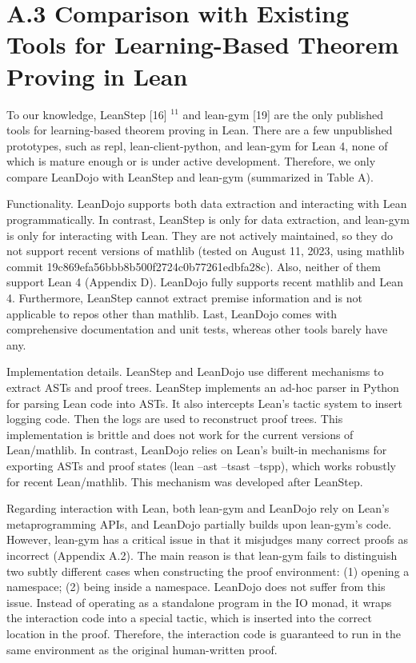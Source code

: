 \documentclass[
]{article}
\begin{document}
\section{A.3 Comparison with Existing Tools for Learning-Based Theorem
Proving in
Lean}\label{a.3-comparison-with-existing-tools-for-learning-based-theorem-proving-in-lean}

To our knowledge, LeanStep {[}16{]} \(^{11}\) and lean-gym {[}19{]} are
the only published tools for learning-based theorem proving in Lean.
There are a few unpublished prototypes, such as repl,
lean-client-python, and lean-gym for Lean 4, none of which is mature
enough or is under active development. Therefore, we only compare
LeanDojo with LeanStep and lean-gym (summarized in Table A).

Functionality. LeanDojo supports both data extraction and interacting
with Lean programmatically. In contrast, LeanStep is only for data
extraction, and lean-gym is only for interacting with Lean. They are not
actively maintained, so they do not support recent versions of mathlib
(tested on August 11, 2023, using mathlib commit
19c869efa56bbb8b500f2724c0b77261edbfa28c). Also, neither of them support
Lean 4 (Appendix D). LeanDojo fully supports recent mathlib and Lean 4.
Furthermore, LeanStep cannot extract premise information and is not
applicable to repos other than mathlib. Last, LeanDojo comes with
comprehensive documentation and unit tests, whereas other tools barely
have any.

Implementation details. LeanStep and LeanDojo use different mechanisms
to extract ASTs and proof trees. LeanStep implements an ad-hoc parser in
Python for parsing Lean code into ASTs. It also intercepts Lean's tactic
system to insert logging code. Then the logs are used to reconstruct
proof trees. This implementation is brittle and does not work for the
current versions of Lean/mathlib. In contrast, LeanDojo relies on Lean's
built-in mechanisms for exporting ASTs and proof states (lean --ast
--tsast --tspp), which works robustly for recent Lean/mathlib. This
mechanism was developed after LeanStep.

Regarding interaction with Lean, both lean-gym and LeanDojo rely on
Lean's metaprogramming APIs, and LeanDojo partially builds upon
lean-gym's code. However, lean-gym has a critical issue in that it
misjudges many correct proofs as incorrect (Appendix A.2). The main
reason is that lean-gym fails to distinguish two subtly different cases
when constructing the proof environment: (1) opening a namespace; (2)
being inside a namespace. LeanDojo does not suffer from this issue.
Instead of operating as a standalone program in the IO monad, it wraps
the interaction code into a special tactic, which is inserted into the
correct location in the proof. Therefore, the interaction code is
guaranteed to run in the same environment as the original human-written
proof.
\end{document}
